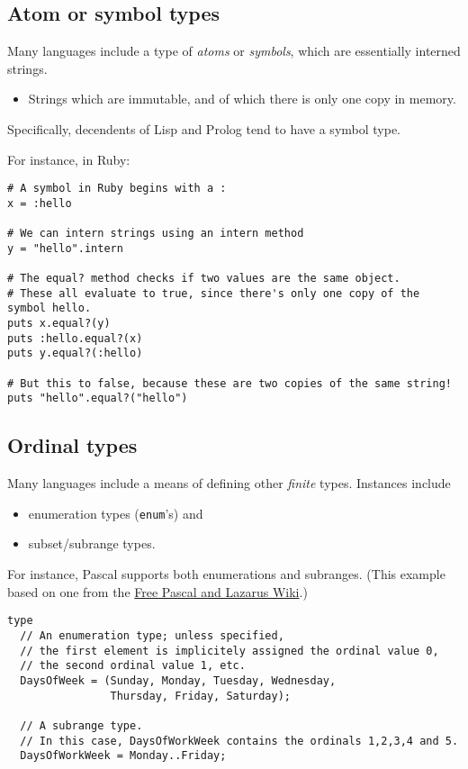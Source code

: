 \documentclass[11pt]{article}
\theoremstyle{definition}
\begin{document}
\subsection{Atom or symbol types}
\label{sec:org282a556}

Many languages include a type of \emph{atoms} or \emph{symbols},
which are essentially interned strings.
\begin{itemize}
\item Strings which are immutable,
and of which there is only one copy in memory.
\end{itemize}

Specifically, decendents of Lisp and Prolog tend to have a symbol type.

For instance, in Ruby:
\begin{verbatim}
# A symbol in Ruby begins with a :
x = :hello

# We can intern strings using an intern method
y = "hello".intern

# The equal? method checks if two values are the same object.
# These all evaluate to true, since there's only one copy of the symbol hello.
puts x.equal?(y)
puts :hello.equal?(x)
puts y.equal?(:hello)

# But this to false, because these are two copies of the same string!
puts "hello".equal?("hello")
\end{verbatim}

\subsection{Ordinal types}
\label{sec:org150e45b}

Many languages include a means of defining other \emph{finite} types.
Instances include
\begin{itemize}
\item enumeration types (\texttt{enum}'s) and
\item subset/subrange types.
\end{itemize}

For instance, Pascal supports both enumerations
and subranges.
(This example based on one from the \href{https://wiki.freepascal.org/Data\_type}{Free Pascal and Lazarus Wiki}.)
\begin{verbatim}
type
  // An enumeration type; unless specified,
  // the first element is implicitely assigned the ordinal value 0,
  // the second ordinal value 1, etc.
  DaysOfWeek = (Sunday, Monday, Tuesday, Wednesday,
                Thursday, Friday, Saturday);

  // A subrange type.
  // In this case, DaysOfWorkWeek contains the ordinals 1,2,3,4 and 5.
  DaysOfWorkWeek = Monday..Friday;
\end{verbatim}
\end{document}
